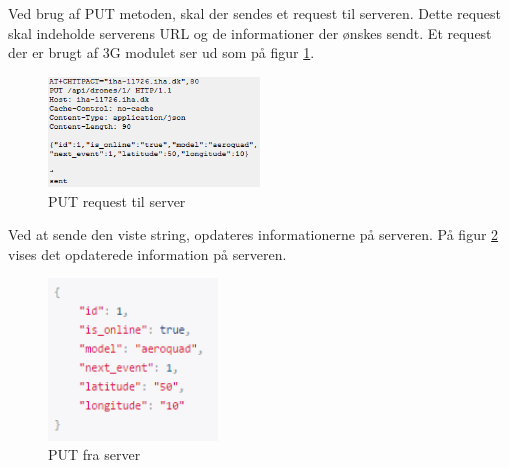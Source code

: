 Ved brug af PUT metoden, skal der sendes et request til serveren. Dette request skal indeholde serverens URL og de informationer der ønskes sendt. Et request der er brugt af 3G modulet ser ud som på figur \ref{fig:puttoserver}.

\begin{figure}[H]
\centering
\includegraphics[width=0.5\textwidth]{Billeder/Test/put_dronerequest.png}
\caption{PUT request til server}
\label{fig:puttoserver}
\end{figure}

 Ved at sende den viste string, opdateres informationerne på serveren. På figur \ref{fig:putdata_server} vises det opdaterede information på serveren.
 
 \begin{figure}[H]
\centering
\includegraphics[width=0.4\textwidth]{Billeder/Test/putdata_server.png}
\caption{PUT fra server}
\label{fig:putdata_server}
\end{figure}